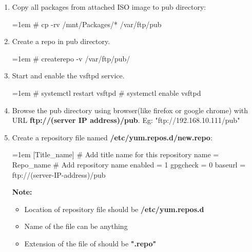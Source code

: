 \begin{flushleft}
\begin{enumerate}
		\item Copy all packages from attached ISO image to pub directory:
		\begin{tcolorbox}[breakable,notitle,boxrule=-0pt,colback=black,colframe=black]
			\color{green}
			\font=1em
			\# cp	-rv	/mnt/Packages/*	/var/ftp/pub
			\font=4pt
		\end{tcolorbox}
		
		\item Create a repo in pub directory.
		\begin{tcolorbox}[breakable,notitle,boxrule=-0pt,colback=black,colframe=black]
			\color{green}
			\font=1em
			\# createrepo	-v	/var/ftp/pub/
			\font=4pt
		\end{tcolorbox}

		\item Start and enable the vsftpd service.
		\begin{tcolorbox}[breakable,notitle,boxrule=-0pt,colback=black,colframe=black]
			\color{green}
			\font=1em
			\# systemctl   restart   vsftpd
			\newline
			\# systemctl   enable    vsftpd
			\font=4pt
		\end{tcolorbox}

		\item Browse the pub directory using browser(like firefox or google chrome) with URL \textbf{ftp://(server IP address)/pub}.
		\newline
		Eg: "ftp://192.168.10.111/pub"

		\item Create a repository file named \textbf{/etc/yum.repos.d/new.repo}:
		\begin{tcolorbox}[breakable,notitle,boxrule=-0pt,colback=black,colframe=black]
			\color{white}
			\font=1em
			[Title\_name] \color{yellow}  \# Add title name for this repository 
			\newline
			\color{white}
			name = Repo\_name
			\color{yellow}
  \# Add repository name
			\newline
			\color{white}
			enabled = 1
			\newline
			gpgcheck = 0
			\newline
			baseurl = ftp://(server-IP-address)/pub
			\font=4pt
		\end{tcolorbox}
		\bigskip
		\begin{tcolorbox}[breakable,notitle,boxrule=-0pt,colback=yellow,colframe=yellow]
			\color{black}
			\textbf{Note:} 
			\begin{itemize}
				\item Location of repository file should be \textbf{/etc/yum.repos.d}
				\item Name of the file can be anything
				\item Extension of the file of should be \textbf{".repo"}
			\end{itemize}
		\end{tcolorbox}
		

\end{enumerate}
\end{flushleft}
